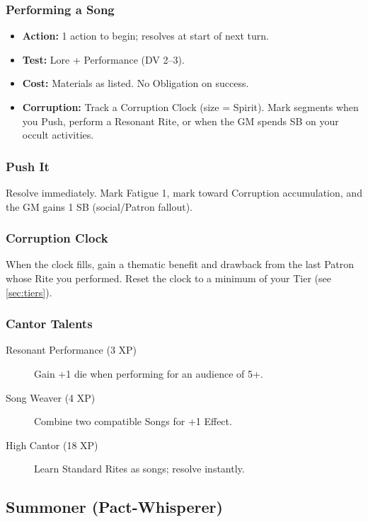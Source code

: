 \subsubsection*{Performing a Song}
\label{sec:performing-song}
\begin{itemize}
  \item \textbf{Action:} 1 action to begin; resolves at start of next turn.
  \item \textbf{Test:} Lore + Performance (DV 2–3).
  \item \textbf{Cost:} Materials as listed. No Obligation on success.
  \item \textbf{Corruption:} Track a Corruption Clock (size = Spirit). Mark segments when you Push, perform a Resonant Rite, or when the GM spends SB on your occult activities.
\end{itemize}

\subsubsection*{Push It}
\label{sec:cantor-push}
Resolve immediately. Mark Fatigue 1, mark toward Corruption accumulation, and the GM gains 1 SB (social/Patron fallout).

\subsubsection*{Corruption Clock}
\label{sec:corruption-clock}
When the clock fills, gain a thematic benefit and drawback from the last Patron whose Rite you performed. Reset the clock to a minimum of your Tier (see \ref{sec:tiers}).

\subsubsection*{Cantor Talents}
\label{sec:cantor-talents}
\begin{description}
  \item[Resonant Performance (3 XP)] Gain +1 die when performing for an audience of 5+.
  \item[Song Weaver (4 XP)] Combine two compatible Songs for +1 Effect.
  \item[High Cantor (18 XP)] Learn Standard Rites as songs; resolve instantly.
\end{description}

\subsection{Summoner (Pact-Whisperer)}
\label{sec:summoner}

